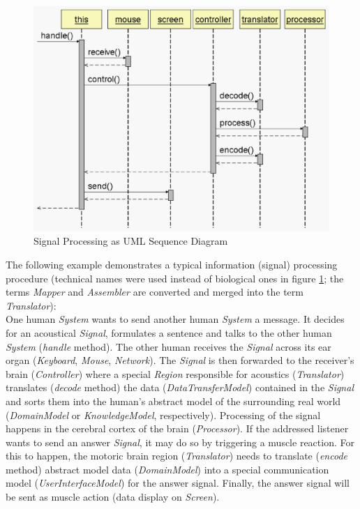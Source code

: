 \begin{figure}[ht]
    \begin{center}
        \includegraphics[scale=0.3]{vector/signal_processing.eps}
        \caption{Signal Processing as UML Sequence Diagram}
        \label{signal_processing_figure}
    \end{center}
\end{figure}

The following example demonstrates a typical information (signal) processing
procedure (technical names were used instead of biological ones in figure
\ref{signal_processing_figure}; the terms \emph{Mapper} and \emph{Assembler}
are converted and merged into the term \emph{Translator}):\\
One human \emph{System} wants to send another human \emph{System} a message.
It decides for an acoustical \emph{Signal}, formulates a sentence and talks to
the other human \emph{System} (\emph{handle} method). The other human receives the
\emph{Signal} across its ear organ (\emph{Keyboard}, \emph{Mouse}, \emph{Network}).
The \emph{Signal} is then forwarded to the receiver's brain (\emph{Controller})
where a special \emph{Region} responsible for acoustics (\emph{Translator})
translates (\emph{decode} method) the data (\emph{DataTransferModel}) contained
in the \emph{Signal} and sorts them into the human's abstract model of the
surrounding real world (\emph{DomainModel} or \emph{KnowledgeModel}, respectively).
Processing of the signal happens in the cerebral cortex of the brain (\emph{Processor}).
If the addressed listener wants to send an answer \emph{Signal}, it may do so by
triggering a muscle reaction. For this to happen, the motoric brain region (\emph{Translator})
needs to translate (\emph{encode} method) abstract model data (\emph{DomainModel})
into a special communication model (\emph{UserInterfaceModel}) for the answer signal.
Finally, the answer signal will be sent as muscle action (data display on \emph{Screen}).


